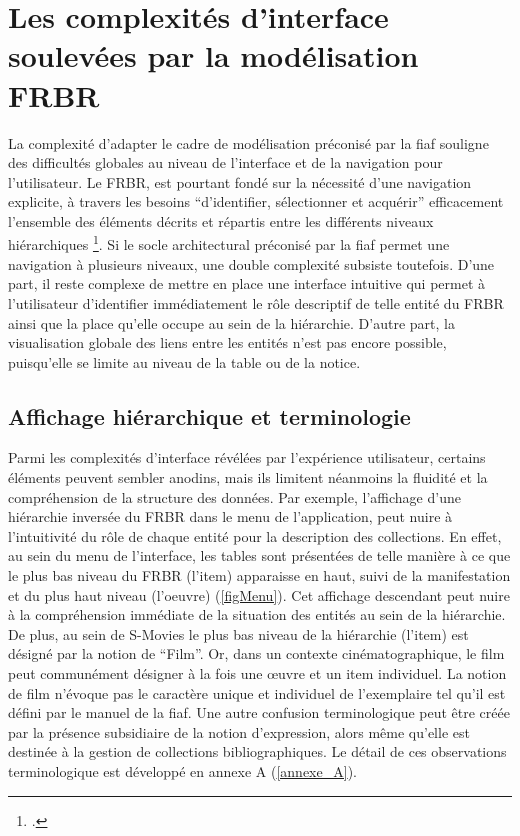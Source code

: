 \section{\label{I_2_C} Les complexités d'interface soulevées par la modélisation \gls{FRBR}}  

La complexité d'adapter le cadre de modélisation préconisé par la \gls{fiaf} souligne des difficultés globales au niveau de l’interface et de la navigation pour l'utilisateur. Le \gls{FRBR}, est pourtant fondé  sur la nécessité d'une navigation explicite, à travers les besoins “d’identifier, sélectionner et acquérir” efficacement l’ensemble des éléments décrits et répartis entre les différents niveaux hiérarchiques \footcite{zotero-item-646}. Si le socle architectural préconisé par la \gls{fiaf} permet une navigation à plusieurs niveaux, une double complexité subsiste toutefois. D’une part, il reste complexe de mettre en place une interface intuitive qui permet à l’utilisateur d'identifier immédiatement le rôle descriptif de telle entité du \gls{FRBR} ainsi que la place qu'elle occupe au sein de la hiérarchie. D’autre part, la visualisation globale des liens entre les entités n'est pas encore possible, puisqu'elle se limite au niveau de la table ou de la notice.

\subsection{Affichage hiérarchique et terminologie}
Parmi les complexités d’interface révélées par l'expérience utilisateur, certains éléments peuvent sembler anodins, mais ils limitent néanmoins la fluidité et la compréhension de la structure des données. Par exemple, l’affichage d’une hiérarchie inversée du \gls{FRBR} dans le menu de l’application, peut nuire à l’intuitivité du rôle de chaque entité pour la description des collections. En effet, au sein du menu de l'interface, les tables sont présentées de telle manière à ce que le plus bas niveau du \gls{FRBR} (l'\gls{item}) apparaisse en haut, suivi de la \gls{manifestation} et du plus haut niveau (l'\gls{oeuvre}) (\cref{figMenu}). Cet affichage descendant peut nuire à la compréhension immédiate de la situation des entités au sein de la hiérarchie. De plus, au sein de S-Movies le plus bas niveau de la hiérarchie (l’\gls{item}) est désigné par la notion de “Film”. Or, dans un contexte cinématographique, le film peut communément désigner à la fois une œuvre et un item individuel. La notion de film n'évoque pas le caractère unique et individuel de l'exemplaire tel qu'il est défini par le manuel de la \gls{fiaf}. Une autre confusion terminologique peut être créée par la présence subsidiaire de la notion d'\gls{expression}, alors même qu'elle est destinée à la gestion de collections bibliographiques. Le détail de ces observations terminologique est développé en annexe A (\ref{annexe_A}).

